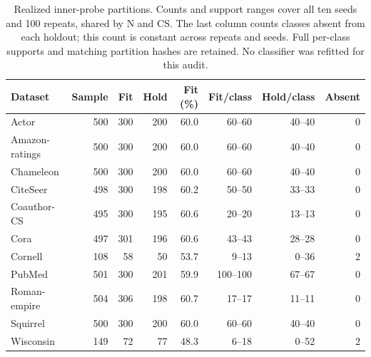 \begin{table}[tbp]
\centering
\caption{Realized inner-probe partitions. Counts and support ranges cover all ten seeds and 100 repeats, shared by N and CS. The last column counts classes absent from each holdout; this count is constant across repeats and seeds. Full per-class supports and matching partition hashes are retained. No classifier was refitted for this audit.}
\label{tab:cpm_support}
\small
\setlength{\tabcolsep}{3pt}
\begin{tabular}{@{}lrrrrrrr@{}}
\toprule
Dataset & Sample & Fit & Hold & Fit (\%) & Fit/class & Hold/class & Absent \\
\midrule
Actor & 500 & 300 & 200 & 60.0 & 60--60 & 40--40 & 0 \\
Amazon-ratings & 500 & 300 & 200 & 60.0 & 60--60 & 40--40 & 0 \\
Chameleon & 500 & 300 & 200 & 60.0 & 60--60 & 40--40 & 0 \\
CiteSeer & 498 & 300 & 198 & 60.2 & 50--50 & 33--33 & 0 \\
Coauthor-CS & 495 & 300 & 195 & 60.6 & 20--20 & 13--13 & 0 \\
Cora & 497 & 301 & 196 & 60.6 & 43--43 & 28--28 & 0 \\
Cornell & 108 & 58 & 50 & 53.7 & 9--13 & 0--36 & 2 \\
PubMed & 501 & 300 & 201 & 59.9 & 100--100 & 67--67 & 0 \\
Roman-empire & 504 & 306 & 198 & 60.7 & 17--17 & 11--11 & 0 \\
Squirrel & 500 & 300 & 200 & 60.0 & 60--60 & 40--40 & 0 \\
Wisconsin & 149 & 72 & 77 & 48.3 & 6--18 & 0--52 & 2 \\
\bottomrule
\end{tabular}
\end{table}
